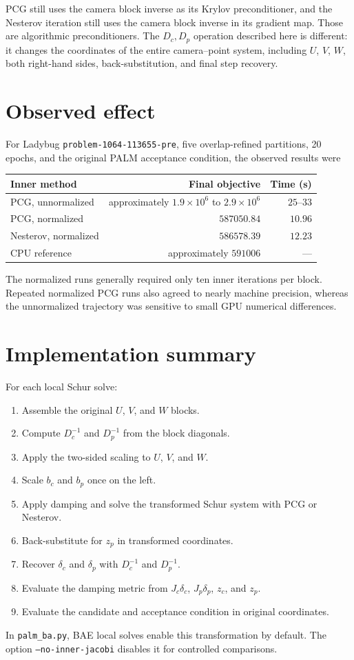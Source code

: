 \documentclass[11pt]{article}
\begin{document}
PCG still uses the camera block inverse as its Krylov preconditioner, and the
Nesterov iteration still uses the camera block inverse in its gradient map.
Those are algorithmic preconditioners.  The $D_c,D_p$ operation described here
is different: it changes the coordinates of the entire camera--point system,
including $U$, $V$, $W$, both right-hand sides, back-substitution, and final step
recovery.

\section{Observed effect}

For Ladybug \texttt{problem-1064-113655-pre}, five overlap-refined partitions,
20 epochs, and the original PALM acceptance condition, the observed results
were
\begin{center}
\begin{tabular}{lrr}
  \toprule
  Inner method & Final objective & Time (s) \\
  \midrule
  PCG, unnormalized & approximately $1.9\times 10^6$ to $2.9\times 10^6$ & $25$--$33$ \\
  PCG, normalized & $587050.84$ & $10.96$ \\
  Nesterov, normalized & $586578.39$ & $12.23$ \\
  CPU reference & approximately $591006$ & --- \\
  \bottomrule
\end{tabular}
\end{center}
The normalized runs generally required only ten inner iterations per block.
Repeated normalized PCG runs also agreed to nearly machine precision, whereas
the unnormalized trajectory was sensitive to small GPU numerical differences.

\section{Implementation summary}

For each local Schur solve:
\begin{enumerate}
  \item Assemble the original $U$, $V$, and $W$ blocks.
    \item Compute $D_c^{-1}$ and $D_p^{-1}$ from the block diagonals.
    \item Apply the two-sided scaling to $U$, $V$, and $W$.
    \item Scale $b_c$ and $b_p$ once on the left.
    \item Apply damping and solve the transformed Schur system with PCG or
        Nesterov.
    \item Back-substitute for $z_p$ in transformed coordinates.
    \item Recover $\delta_c$ and $\delta_p$ with $D_c^{-1}$ and $D_p^{-1}$.
    \item Evaluate the damping metric from $J_c\delta_c$, $J_p\delta_p$, $z_c$,
      and $z_p$.
    \item Evaluate the candidate and acceptance condition in original
        coordinates.
\end{enumerate}

In \texttt{palm\_ba.py}, BAE local solves enable this transformation by
default.  The option \texttt{--no-inner-jacobi} disables it for controlled
comparisons.
\end{document}
